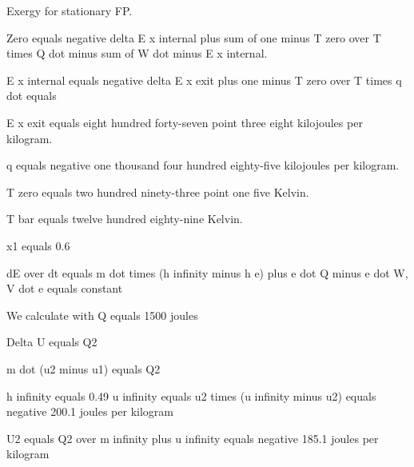 Exergy for stationary FP.

Zero equals negative delta E x internal plus sum of one minus T zero over T times Q dot minus sum of W dot minus E x internal.

E x internal equals negative delta E x exit plus one minus T zero over T times q dot equals

E x exit equals eight hundred forty-seven point three eight kilojoules per kilogram.

q equals negative one thousand four hundred eighty-five kilojoules per kilogram.

T zero equals two hundred ninety-three point one five Kelvin.

T bar equals twelve hundred eighty-nine Kelvin.

x1 equals 0.6

dE over dt equals m dot times (h infinity minus h e) plus e dot Q minus e dot W, V dot e equals constant

We calculate with Q equals 1500 joules

Delta U equals Q2

m dot (u2 minus u1) equals Q2

h infinity equals 0.49 u infinity equals u2 times (u infinity minus u2) equals negative 200.1 joules per kilogram

U2 equals Q2 over m infinity plus u infinity equals negative 185.1 joules per kilogram